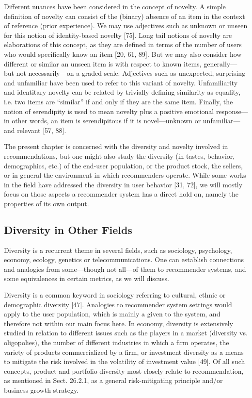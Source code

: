 Different nuances have been considered in the concept of novelty. A simple definition of novelty can consist of the (binary) absence of an item in the context of reference (prior experience). We may use adjectives such as unknown or unseen for this notion of identity-based novelty [75]. Long tail notions of novelty are elaborations of this concept, as they are defined in terms of the number of users who would specifically know an item [20, 61, 89]. But we may also consider how different or similar an unseen item is with respect to known items, generally— but not necessarily—on a graded scale. Adjectives such as unexpected, surprising and unfamiliar have been used to refer to this variant of novelty. Unfamiliarity and identitary novelty can be related by trivially defining similarity as equality, i.e. two items are “similar” if and only if they are the same item. Finally, the notion of serendipity is used to mean novelty plus a positive emotional response— in other words, an item is serendipitous if it is novel—unknown or unfamiliar—and relevant [57, 88].

The present chapter is concerned with the diversity and novelty involved in recommendations, but one might also study the diversity (in tastes, behavior, demographics, etc.) of the end-user population, or the product stock, the sellers, or in general the environment in which recommenders operate. While some works in the field have addressed the diversity in user behavior [31, 72], we will mostly focus on those aspects a recommender system has a direct hold on, namely the properties of its own output.

\subsection{Diversity in Other Fields}

Diversity is a recurrent theme in several fields, such as sociology, psychology, economy, ecology, genetics or telecommunications. One can establish connections and analogies from some—though not all—of them to recommender systems, and some equivalences in certain metrics, as we will discuss.

Diversity is a common keyword in sociology referring to cultural, ethnic or demographic diversity [47]. Analogies to recommender system settings would apply to the user population, which is mainly a given to the system, and therefore not within our main focus here. In economy, diversity is extensively studied in relation to different issues such as the players in a market (diversity vs. oligopolies), the number of different industries in which a firm operates, the variety of products commercialized by a firm, or investment diversity as a means to mitigate the risk involved in the volatility of investment value [49]. Of all such concepts, product and portfolio diversity most closely relate to recommendation, as mentioned in Sect. 26.2.1, as a general risk-mitigating principle and/or business growth strategy.

